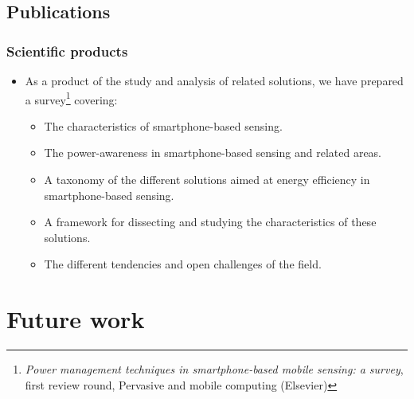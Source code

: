 \documentclass[compress,9pt,xcolor={dvipsnames,table}]{beamer}
\begin{document}
\subsection{Publications}
\begin{frame}[t]\frametitle{Scientific products}
\begin{itemize}
  \item As a product of the study and analysis of related solutions, we have prepared a survey\footnote{\tiny \emph{Power management techniques in smartphone-based mobile sensing: a survey}, first review round, Pervasive and mobile computing (Elsevier)} covering:
  \begin{itemize}
    \item The characteristics of smartphone-based sensing.
    \item The power-awareness in smartphone-based sensing and related areas.
    \item A taxonomy of the different solutions aimed at energy efficiency in smartphone-based sensing.
    \item A framework for dissecting and studying the characteristics of these solutions.
    \item The different tendencies and open challenges of the field.
  \end{itemize}
\end{itemize}
\end{frame}


\section{Future work}
\end{document}
